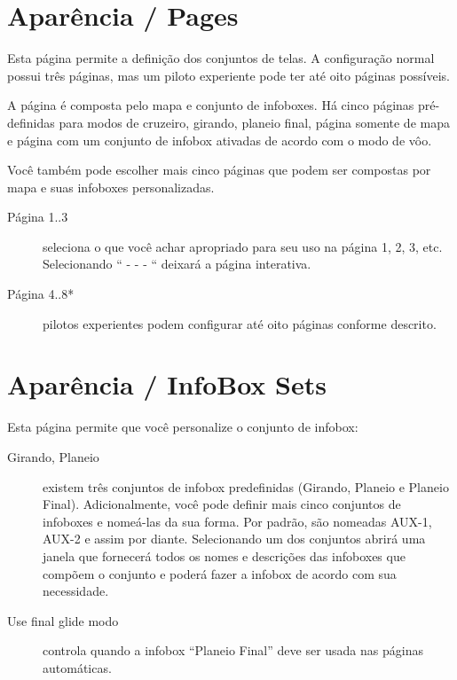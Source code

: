\section{Aparência / Pages}\label{conf:screenpages}

Esta página permite a definição dos conjuntos de telas.  A configuração normal possui três páginas, mas um piloto experiente pode ter até oito páginas possíveis.

A página é composta pelo mapa e conjunto de infoboxes.  Há cinco páginas pré-definidas para modos de cruzeiro, girando, planeio final, página somente de mapa e página com um conjunto de infobox ativadas de acordo com o modo de vôo.

Você também pode escolher mais cinco páginas que podem ser compostas por mapa e suas infoboxes personalizadas.


\begin{description}
\item[Página 1..3]  seleciona o que você achar apropriado para seu uso na página 1, 2, 3, etc.  Selecionando “ - - - “ deixará a página interativa.
\item[Página 4..8*]  pilotos experientes podem configurar até oito páginas conforme descrito.
\end{description}


\section{Aparência / InfoBox  Sets}\label{sec:infobox_sets}
\label{conf:infobox_sets}

Esta página permite que você personalize o conjunto de infobox:

\begin{description}
\item[Girando, Planeio]  existem três conjuntos de infobox predefinidas (Girando, Planeio e Planeio Final).  Adicionalmente, você pode definir mais cinco conjuntos de infoboxes e nomeá-las da sua forma.  Por padrão, são nomeadas AUX-1, AUX-2 e assim por diante.
Selecionando um dos conjuntos abrirá uma janela que fornecerá todos os nomes e descrições das infoboxes que compõem o conjunto e poderá fazer a infobox de acordo com sua necessidade.

\item[Use final glide modo]  controla quando a infobox “Planeio Final” deve ser usada nas páginas automáticas.
\end{description}

